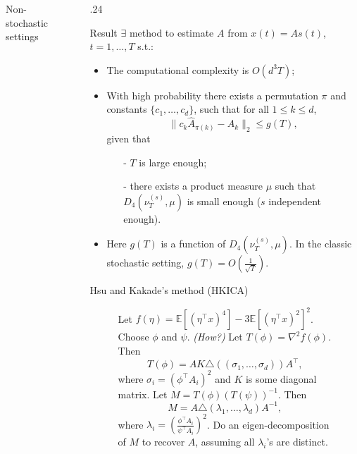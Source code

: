 \documentclass[final]{beamer} %
\newcommand{\EEp}[1]{\mathbb{E}\left[#1\right]}
\begin{document}
\begin{frame}[c]
\begin{columns}[t,totalwidth=\textwidth]
\begin{column}{.24\textwidth}
\begin{block}{Non-stochastic settings}
		\end{block}
	\end{column}
	\begin{column}{0.01\textwidth}
	\end{column}
	\begin{column} {.24\textwidth}
		\begin{block}{Result}
			$\exists$ method to estimate $A$ from $x(t)=A s(t)$, $t=1,\dots,T$ s.t.:
			\begin{itemize}
				\item The computational complexity is $O(d^3 T)$;
				\item With high probability there exists a permutation $\pi$ and constants $\{c_1,\ldots,c_d\}$, such that for all $1\le k\le d$, 
				\[\| c_k\hat{A}_{\pi(k)} - A_k\|_2 \le g(T),\]
				given that 
				\begin{itemize}
					\item[-]  $T$ is large enough;
					\item[-]  there exists a product measure $\mu$ such that $D_4(\nu_T^{(s)},\mu)$ is small enough ($s$ independent enough).
				\end{itemize}
				\item Here $g(T)$ is a function of $D_4(\nu_T^{(s)},\mu)$. In the classic stochastic setting, $g(T) = O(\frac{1}{\sqrt{T}})$.
			\end{itemize}
		\end{block}
		\vspace{0.5ex}
		\begin{block}{Hsu and Kakade's method (HKICA)}
			\begin{figure}
			\begin{algorithmic}[1]
				\STATE Let $f(\eta) = \EEp{(\eta^{\top}x)^4} - 3 \EEp{(\eta^{\top}x)^2}^2$.
				\STATE  Choose $\phi$ and $\psi$. \emph{(How?)}
				\STATE Let $T(\phi) = \nabla^2 f(\phi)$. Then 
					\[T(\phi) = AK \triangle\left( (\sigma_1,\ldots,  \sigma_d)\right)A^{\top},
					\]
					where $\sigma_i = \left(\phi^{\top}A_i\right)^2$ and $K$ is some diagonal matrix.
				\STATE Let $M = T(\phi)(T(\psi))^{-1}$. Then 
					\[M = A \triangle \left( \lambda_1, \ldots, \lambda_d \right) A^{-1},
					\]
					where $\lambda_i = \left(\frac{\phi^{\top}A_i}{\psi^{\top}A_i}\right)^2$.
				\STATE Do an eigen-decomposition of $M$ to recover $A$, assuming all $\lambda_i$'s are distinct.

\end{algorithmic}
\end{figure}
\end{block}
\end{column}
\end{columns}
\end{frame}
\end{document}
